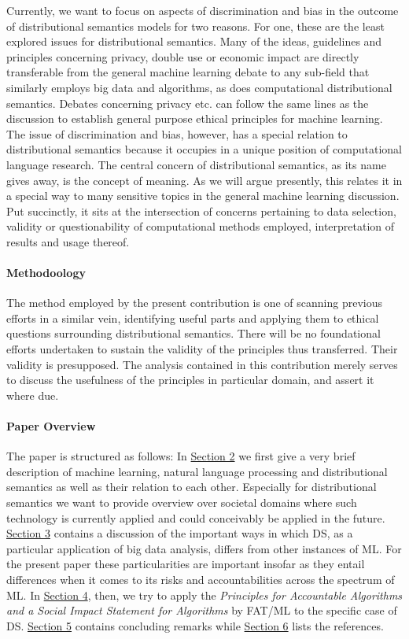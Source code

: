 \documentclass{article}
\begin{document}
Currently, we want to focus on aspects of discrimination and bias in the outcome of distributional semantics models for two reasons. For one, these are the least explored issues for distributional semantics. Many of the ideas, guidelines and principles concerning privacy, double use or economic impact are directly transferable from the general machine learning debate to any sub-field that similarly employs big data and algorithms, as does computational distributional semantics. Debates concerning privacy etc. can follow the same lines as the discussion to establish general purpose ethical principles for machine learning. The issue of discrimination and bias, however, has a special relation to distributional semantics because it occupies in a unique position of computational language research. The central concern of distributional semantics, as its name gives away, is the concept of meaning. As we will argue presently, this relates it in a special way to many sensitive topics in the general machine learning discussion. Put succinctly, it sits at the intersection of concerns pertaining to data selection, validity or questionability of computational methods employed, interpretation of results and usage thereof.

\paragraph{Methodoology}
The method employed by the present contribution is one of scanning previous efforts in a similar vein, identifying useful parts and applying them to ethical questions surrounding distributional semantics. There will be no foundational efforts undertaken to sustain the validity of the principles thus transferred.  Their validity is presupposed. The analysis contained in this contribution merely serves to discuss the usefulness of the principles in particular domain, and assert it where due.

\paragraph{Paper Overview}
The paper is structured as follows: In \hyperlink{sec2}{Section 2} we first give a very brief description of machine learning, natural language processing and distributional semantics as well as their relation to each other. Especially for distributional semantics we want to provide overview over societal domains where such technology is currently applied and could conceivably be applied in the future. \hyperlink{sec3}{Section 3} contains a discussion of the important ways in which DS, as a particular application of big data analysis, differs from other instances of ML. For the present paper these particularities are important insofar as they entail differences when it comes to its risks and accountabilities across the spectrum of ML. In \hyperlink{sec4}{Section 4}, then, we try to apply the \emph{Principles for Accountable Algorithms and a Social Impact Statement for Algorithms} by FAT/ML to the specific case of DS. \hyperlink{sec5}{Section 5} contains concluding remarks while \hyperlink{sec6}{Section 6} lists the references.
\end{document}

